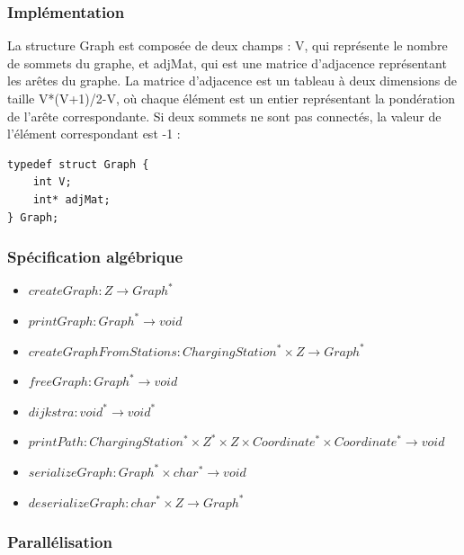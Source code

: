 \documentclass[french,a4paper]{article}
\begin{document}
    \subsubsection{Implémentation}
    La structure Graph est composée de deux champs : V, qui représente le nombre de sommets du graphe, et adjMat, qui est une matrice d'adjacence représentant les arêtes du graphe. La matrice d'adjacence est un tableau à deux dimensions de taille V*(V+1)/2-V, où chaque élément est un entier représentant la pondération de l'arête correspondante. Si deux sommets ne sont pas connectés, la valeur de l'élément correspondant est -1 : \\

    \begin{center}
        \begin{lstlisting}[caption=Structure du Graph]
typedef struct Graph {
    int V;
    int* adjMat;
} Graph;
        \end{lstlisting}
    \end{center}

    \subsubsection{Spécification algébrique}

    \begin{itemize}
        \item $createGraph : {Z} \rightarrow Graph^*$
        \item $printGraph : Graph^* \rightarrow void$
        \item $createGraphFromStations : ChargingStation^* \times {Z} \rightarrow Graph^*$
        \item $freeGraph : Graph^* \rightarrow void$
        \item $dijkstra : void^* \rightarrow void^*$
        \item $printPath : ChargingStation^* \times {Z}^* \times {Z} \times Coordinate^* \times Coordinate^* \rightarrow void$
        \item $serializeGraph : Graph^* \times char^* \rightarrow void$
        \item $deserializeGraph : char^* \times {Z} \rightarrow Graph^*$
    \end{itemize}

    \subsubsection{Parallélisation}
\end{document}
